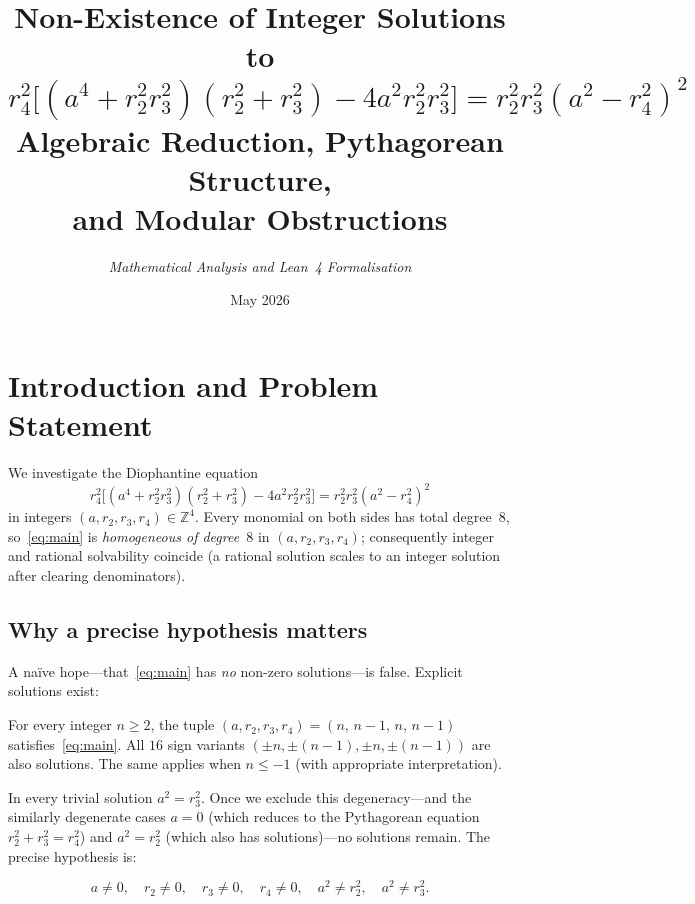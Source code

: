 \documentclass[12pt, a4paper]{article}
\title{\bfseries\Large Non-Existence of Integer Solutions to\\[4pt]
  $r_4^2\bigl[(a^4 + r_2^2 r_3^2)(r_2^2 + r_3^2)
    - 4a^2 r_2^2 r_3^2\bigr] = r_2^2 r_3^2(a^2 - r_4^2)^2$
  \\[6pt]
  \large Algebraic Reduction, Pythagorean Structure,\\
  and Modular Obstructions}
\author{\itshape Mathematical Analysis and Lean~4 Formalisation}
\date{May 2026}
\theoremstyle{definition}
\newcommand{\Z}{\mathbb{Z}}
\begin{document}
\maketitle
\tableofcontents
\newpage

\section{Introduction and Problem Statement}

We investigate the Diophantine equation
\begin{equation}\label{eq:main}
  r_4^2\bigl[(a^4 + r_2^2 r_3^2)(r_2^2 + r_3^2) - 4a^2 r_2^2 r_3^2\bigr]
  = r_2^2 r_3^2(a^2 - r_4^2)^2
\end{equation}
in integers $(a, r_2, r_3, r_4) \in \Z^4$.  Every monomial on both sides has
total degree~$8$, so~\eqref{eq:main} is \emph{homogeneous of degree~$8$} in
$(a, r_2, r_3, r_4)$; consequently integer and rational solvability coincide
(a rational solution scales to an integer solution after clearing
denominators).

\subsection*{Why a precise hypothesis matters}

A na\"ive hope---that~\eqref{eq:main} has \emph{no} non-zero solutions---is
false.  Explicit solutions exist:

\begin{tcolorbox}[thm, title={Trivial Family}]
  For every integer $n \geq 2$, the tuple $(a,r_2,r_3,r_4)=(n,\,n{-}1,\,n,\,n{-}1)$
  satisfies~\eqref{eq:main}.  All $16$ sign variants
  $(\pm n, \pm(n-1), \pm n, \pm(n-1))$ are also solutions.
  The same applies when $n\leq -1$ (with appropriate interpretation).
\end{tcolorbox}

\noindent
In every trivial solution $a^2 = r_3^2$.  Once we exclude this degeneracy---and
the similarly degenerate cases $a = 0$ (which reduces to the Pythagorean
equation $r_2^2+r_3^2=r_4^2$) and $a^2 = r_2^2$ (which also has solutions)---no
solutions remain.  The precise hypothesis is:

\begin{tcolorbox}[thm, title={Separated Conditions}]
  \begin{equation}\label{eq:sep}
    a \neq 0, \quad r_2 \neq 0, \quad r_3 \neq 0, \quad r_4 \neq 0,
    \quad a^2 \neq r_2^2, \quad a^2 \neq r_3^2.
  \end{equation}
\end{tcolorbox}
\end{document}
